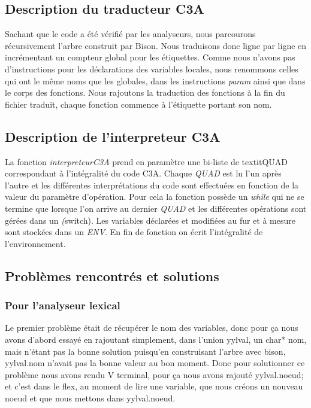 \documentclass[10pt,a4paper]{article}
\begin{document}
\subsection{Description du traducteur C3A}
Sachant que le code a été vérifié par les analyseurs, nous parcourons récursivement l'arbre construit par Bison. Nous traduisons donc ligne par ligne en incrémentant un compteur global pour les étiquettes. Comme nous n'avons pas d'instructions pour les déclarations des variables locales, nous renommons celles qui ont le même noms que les globales, dans les instructions \textit{param} ainsi que dans le corps des fonctions. Nous rajoutons la traduction des fonctions à la fin du fichier traduit, chaque fonction commence à l'étiquette portant son nom.

\subsection{Description de l'interpreteur C3A}
La fonction \textit{interpreteurC3A} prend en paramètre une bi-liste de textit{QUAD} correspondant à l'intégralité du code C3A. Chaque \textit{QUAD} est lu l'un après l'autre et les différentes interprétations du code sont effectuées en fonction de la valeur du paramètre d'opération. Pour cela la fonction possède un \textit{while} qui ne se termine que lorsque l'on arrive au dernier \textit{QUAD} et les différentes opérations sont gérées dans un \textit(switch). Les variables déclarées et modifiées au fur et à mesure sont stockées dans un \textit{ENV}. En fin de fonction on écrit l'intégralité de l'environnement.  

\subsection{Problèmes rencontrés et solutions}
\subsubsection{Pour l'analyseur lexical}
Le premier problème était de récupérer le nom des variables, donc pour ça nous avons d'abord essayé en rajoutant simplement, dans l'union yylval, un char* nom, mais n'étant pas la bonne solution puisqu'en construisant l'arbre avec bison, yylval.nom n'avait pas la bonne valeur au bon moment. Donc pour solutionner ce problème nous avons rendu V terminal, pour ça nous avons rajouté yylval.noeud; et c'est dans le flex, au moment de lire une variable, que nous créons un nouveau noeud et que nous mettons dans yylval.noeud.
\end{document}
